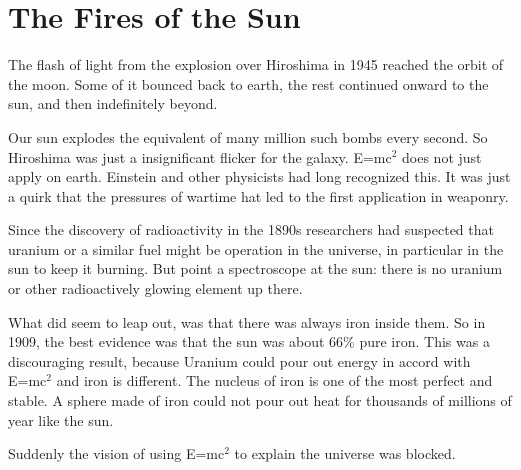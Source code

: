 %

\section{The Fires of the Sun}

The flash of light from the explosion over Hiroshima in 1945 reached the orbit of the moon. Some of it bounced back to earth, the rest continued onward to the sun, and then indefinitely beyond.

Our sun explodes the equivalent of many million such bombs every second. So Hiroshima was just a insignificant flicker for the galaxy. E=mc$^2$ does not just apply on earth. Einstein and other physicists had long recognized this. It was just a quirk that the pressures of wartime hat led to the first application in weaponry.

Since the discovery of radioactivity in the 1890s researchers had suspected that uranium or a similar fuel might be operation in the universe, in particular in the sun to keep it burning. But point a spectroscope at the sun: there is no uranium or other radioactively glowing element up there.

What did seem to leap out, was that there was always iron inside them. So in 1909, the best evidence was that the sun was about 66\% pure iron. This was a discouraging result, because Uranium could pour out energy in accord with E=mc$^2$ and iron is different. The nucleus of iron is one of the most perfect and stable. A sphere made of iron could not pour out heat for thousands of millions of year like the sun. 

Suddenly the vision of using E=mc$^2$ to explain the universe was blocked.

